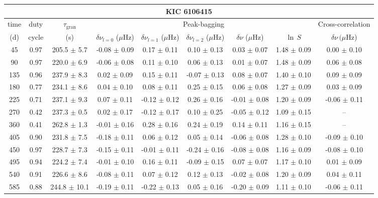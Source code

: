 \documentclass[twocolumn]{aastex61}%
\begin{document}
\begin{table*}[ht]\centering\fontsize{9.}{7.}\selectfont
\begin{tabular}{ccc|ccccc|c}
\multicolumn{9}{c}{KIC 6106415}\\ \hline\hline
time & duty & $\tau_\text{gran}$ &\multicolumn{5}{c|}{Peak-bagging}&Cross-correlation\\
(d)& cycle & (s)&$\delta\nu_{l=0}$ ($\mu$Hz) & $\delta\nu_{l=1}$ ($\mu$Hz) & $\delta\nu_{l=2}$ ($\mu$Hz) & $\delta\nu$ ($\mu$Hz)& $\ln\,S$ & $\delta\nu\,(\mu$Hz)\\\hline
45 & 0.97 & 205.5 $\pm$ 5.7 & -0.08 $\pm$ 0.09 & 0.17 $\pm$ 0.11 & 0.10 $\pm$ 0.13 & 0.03 $\pm$ 0.07 & 1.48 $\pm$ 0.09 & 0.00 $\pm$ 0.10\\
90 & 0.97 & 220.0 $\pm$ 6.9 & -0.06 $\pm$ 0.08 & 0.11 $\pm$ 0.10 & 0.06 $\pm$ 0.13 & 0.01 $\pm$ 0.07 & 1.48 $\pm$ 0.09 & 0.06 $\pm$ 0.08\\
135 & 0.96 & 237.9 $\pm$ 8.3 & 0.02 $\pm$ 0.09 & 0.15 $\pm$ 0.11 & -0.07 $\pm$ 0.13 & 0.08 $\pm$ 0.07 & 1.40 $\pm$ 0.10 & 0.09 $\pm$ 0.09\\
180 & 0.77 & 234.1 $\pm$ 8.6 & 0.04 $\pm$ 0.10 & 0.08 $\pm$ 0.11 & 0.25 $\pm$ 0.15 & 0.06 $\pm$ 0.08 & 1.27 $\pm$ 0.09 & 0.03 $\pm$ 0.09\\
225 & 0.71 & 237.1 $\pm$ 9.3 & 0.07 $\pm$ 0.11 & -0.12 $\pm$ 0.12 & 0.26 $\pm$ 0.16 & -0.01 $\pm$ 0.08 & 1.20 $\pm$ 0.09 & -0.06 $\pm$ 0.11\\
270 & 0.42 & 237.3 $\pm$ 0.5 & 0.02 $\pm$ 0.17 & -0.12 $\pm$ 0.17 & 0.10 $\pm$ 0.25 & -0.05 $\pm$ 0.12 & 1.09 $\pm$ 0.15 & --\\
360 & 0.41 & 262.8 $\pm$ 1.3 & -0.01 $\pm$ 0.16 & 0.28 $\pm$ 0.16 & 0.24 $\pm$ 0.19 & 0.14 $\pm$ 0.11 & 1.16 $\pm$ 0.15 & --\\
405 & 0.90 & 231.8 $\pm$ 7.5 & -0.18 $\pm$ 0.11 & 0.06 $\pm$ 0.12 & 0.05 $\pm$ 0.14 & -0.06 $\pm$ 0.08 & 1.28 $\pm$ 0.10 & -0.09 $\pm$ 0.10\\
450 & 0.97 & 228.7 $\pm$ 7.3 & -0.15 $\pm$ 0.11 & -0.01 $\pm$ 0.11 & -0.24 $\pm$ 0.16 & -0.08 $\pm$ 0.08 & 1.16 $\pm$ 0.09 & -0.08 $\pm$ 0.10\\
495 & 0.94 & 224.2 $\pm$ 7.4 & -0.01 $\pm$ 0.10 & 0.16 $\pm$ 0.11 & -0.09 $\pm$ 0.15 & 0.07 $\pm$ 0.07 & 1.17 $\pm$ 0.10 & 0.01 $\pm$ 0.09\\
540 & 0.91 & 226.6 $\pm$ 8.6 & -0.08 $\pm$ 0.11 & 0.07 $\pm$ 0.12 & 0.12 $\pm$ 0.13 & -0.02 $\pm$ 0.08 & 1.20 $\pm$ 0.09 & 0.04 $\pm$ 0.11\\
585 & 0.88 & 244.8 $\pm$ 10.1 & -0.19 $\pm$ 0.11 & -0.22 $\pm$ 0.13 & 0.05 $\pm$ 0.16 & -0.20 $\pm$ 0.09 & 1.11 $\pm$ 0.10 & -0.06 $\pm$ 0.11\\

\end{tabular}
\end{table*}
\end{document}
